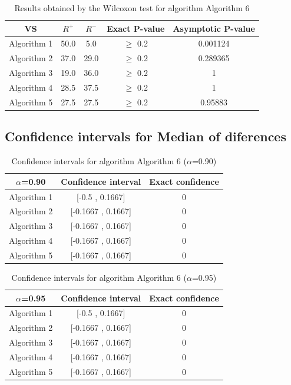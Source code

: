 \documentclass[a4paper,10pt]{article}
\begin{document}
\begin{table}[!htp]
\centering\small
\begin{tabular}{
|c|c|c|c|c|}
\hline
 VS & $R^{+}$ & $R^{-}$ & Exact P-value & Asymptotic P-value \\ \hline 
Algorithm 1 & 50.0 & 5.0 & $\geq$ 0.2 & 0.001124\\ \hline 
Algorithm 2 & 37.0 & 29.0 & $\geq$ 0.2 & 0.289365\\ \hline 
Algorithm 3 & 19.0 & 36.0 & $\geq$ 0.2 & 1\\ \hline 
Algorithm 4 & 28.5 & 37.5 & $\geq$ 0.2 & 1\\ \hline 
Algorithm 5 & 27.5 & 27.5 & $\geq$ 0.2 & 0.95883\\ \hline 

\end{tabular}
\caption{Results obtained by the Wilcoxon test for algorithm Algorithm 6}
\end{table}

\subsection{Confidence intervals for Median of diferences}

\begin{table}[!htp]
\centering\small
\begin{tabular}{
|c|c|c|}
\hline
 $\alpha$=0.90 & Confidence interval & Exact confidence \\ \hline 
Algorithm 1 & [-0.5 , 0.1667] & 0\\ \hline 
Algorithm 2 & [-0.1667 , 0.1667] & 0\\ \hline 
Algorithm 3 & [-0.1667 , 0.1667] & 0\\ \hline 
Algorithm 4 & [-0.1667 , 0.1667] & 0\\ \hline 
Algorithm 5 & [-0.1667 , 0.1667] & 0\\ \hline 

\end{tabular}
\caption{Confidence intervals for algorithm Algorithm 6 ($\alpha$=0.90)}
\end{table}
\begin{table}[!htp]
\centering\small
\begin{tabular}{
|c|c|c|}
\hline
 $\alpha$=0.95 & Confidence interval & Exact confidence \\ \hline 
Algorithm 1 & [-0.5 , 0.1667] & 0\\ \hline 
Algorithm 2 & [-0.1667 , 0.1667] & 0\\ \hline 
Algorithm 3 & [-0.1667 , 0.1667] & 0\\ \hline 
Algorithm 4 & [-0.1667 , 0.1667] & 0\\ \hline 
Algorithm 5 & [-0.1667 , 0.1667] & 0\\ \hline 

\end{tabular}
\caption{Confidence intervals for algorithm Algorithm 6 ($\alpha$=0.95)}
\end{table}

 \clearpage 
\end{document}
